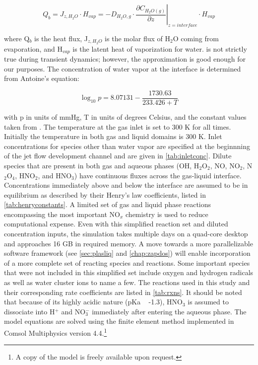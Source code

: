\begin{equation}
    Q_b = J_{z,H_2O}\cdot H_{vap} = -D_{H_2O,g}\cdot \left.\frac{\partial C_{H_2O(g)}}{\partial z}\right|_{z=interface}\cdot H_{vap}
    \label{eq:vapheatsrc}
\end{equation}

where Q$_b$ is the heat flux, J$_{z,H_2O}$ is the molar flux of H$_2$O coming from evaporation, and H$_{vap}$ is the latent heat of vaporization for water.  is not strictly true during transient dynamics; however, the approximation is good enough for our purposes. The concentration of water vapor at the interface is determined from Antoine's equation: \cite{antoine1888thermodynamic}

\begin{equation}
    \log_{10}p = 8.07131 - \frac{1730.63}{233.426+T}
    \label{eq:Antoine}
\end{equation}

with p in units of mmHg, T in units of degrees Celsius, and the constant values taken from \cite{dimian2014integrated}.  The temperature at the gas inlet is set to 300 K for all times. Initially the temperature in both gas and liquid domains is 300 K. Inlet concentrations for species other than water vapor are specified at the beginnning of the jet flow development channel and are given in \cref{tab:inletconc}. Dilute species that are present in both gas and aqueous phases (OH, H$_2$O$_2$, NO, NO$_2$, N$_2$O$_4$, HNO$_2$, and HNO$_3$) have continuous fluxes across the gas-liquid interface. Concentrations immediately above and below the interface are assumed to be in equilibrium as described by their Henry's law coefficients, listed in \cref{tab:henryconstants}. A limited set of gas and liquid phase reactions encompassing the most important NO$_x$ chemistry is used to reduce computational expense. Even with this simplified reaction set and diluted concentration inputs, the simulation takes multiple days on a quad-core desktop and approaches 16 GB in required memory. A move towards a more parallelizable software framework (see \cref{sec:plasliq} and \cref{chap:zapdos}) will enable incorporation of a more complete set of reacting species and reactions.  Some important species that were not included in this simplified set include oxygen and hydrogen radicals as well as water cluster ions to name a few. \cite{liu2010global} The reactions used in this study and their corresponding rate coefficients are listed in \cref{tab:rxns}. It should be noted that because of its highly acidic nature (pKa ~ -1.3), HNO$_3$ is assumed to dissociate into H$^+$ and NO$_3^-$ immediately after entering the aqueous phase. The model equations are solved using the finite element method implemented in Comsol Multiphysics version 4.4.\footnote{A copy of the model is freely available upon request.}

